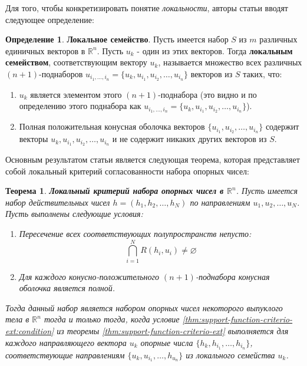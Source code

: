 \documentclass[a4paper, 12pt, titlepage]{article}
\theoremstyle{definition}
\newtheorem{SmartDefinition}{Определение}
\theoremstyle{plain}
\newtheorem{SmartTheorem}{Теорема}
\theoremstyle{plain}
\begin{document}
Для того, чтобы конкретизировать понятие \textit{локальности}, авторы статьи
вводят следующее определение:

\begin{SmartDefinition}
 \label{def:local-family}
 \textbf{Локальное семейство}.
 Пусть имеется набор $\mathit{S}$ из $m$ различных единичных векторов в
 $\mathbb{R}^{n}$. Пусть $u_{k}$ - один из этих векторов. Тогда
 \textbf{локальным семейством}, соответствующим вектору $u_{k}$, называется
 множество всех различных $(n + 1)$-поднаборов $u_{i_{1}, \ldots,
 i_{n}} = \{u_{k}, u_{i_{1}}, u_{i_{2}}, \ldots, u_{i_{n}}\}$ векторов из
 $\mathit{S}$ таких,
 что:
 \begin{enumerate}
  \item $u_{k}$ является элементом этого $(n + 1)$-поднабора (это видно и по
  определению этого поднабора как $u_{i_{1}, \ldots,
 i_{n}} = \{u_{k}, u_{i_{1}}, u_{i_{2}}, \ldots, u_{i_{n}}\}$).
  \item Полная положительная конусная оболочка векторов $\{u_{i_{1}},
  u_{i_{2}}, \ldots, u_{i_{n}}\}$ содержит векторы $u_{k}, u_{i_{1}}, u_{i_{2}},
  \ldots, u_{i_{n}}$ и не содержит никаких других векторов из $\mathit{S}$.
 \end{enumerate}
\end{SmartDefinition}

Основным результатом статьи является следующая теорема, которая представляет
собой локальный критерий согласованности набора опорных чисел:

\begin{SmartTheorem}
 \label{thm:local-global-consistency-equivalence}
 \textbf{Локальный критерий набора опорных чисел в $\mathbb{R}^{n}$}.
 Пусть имеется набор действительных чисел $h = (h_{1}, h_{2}, \ldots, h_{N})$ по
 направлениям $u_{1}, u_{2}, \ldots, u_{N}$. Пусть выполнены следующие
 условия:
 \begin{enumerate}
  \item Пересечение всех соответствующих полупространств непусто:
  \begin{equation}
   \bigcap \limits_{i = 1}^{N} R(h_{i}, u_{i}) \neq \varnothing
  \end{equation}
  \item Для каждого конусно-положительного $(n + 1)$-поднабора конусная оболочка
  является полной.
 \end{enumerate}

 Тогда данный набор является набором опорных чисел некоторого выпуклого тела в
 $\mathbb{R}^{n}$ тогда и только тогда, когда условие
 \ref{thm:support-function-criterio-ext:condition} из теоремы
 \ref{thm:support-function-criterio-ext} выполняется для каждого направляющего
 вектора $u_{k}$ опорные числа $\{h_{k}, h_{i_{1}}, \ldots, h_{i_{n}}\}$,
 соответствующие направлениям $\{u_{k}, u_{i_{1}}, \ldots, h_{u_{n}}\}$ из
 локального семейства $u_{k}$.
\end{SmartTheorem}
\end{document}
